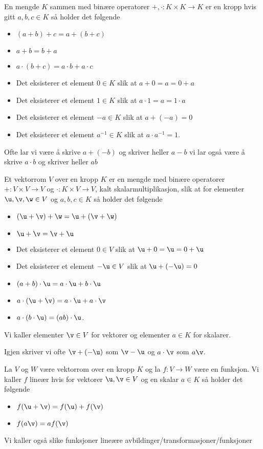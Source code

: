 \begin{definition}\label{Def:Kropp}
   En mengde $K$ sammen med binære operatorer $+,\cdot: K\times K\to K$ er en kropp hvis gitt $a,b,c\in K$ så holder det følgende
   \begin{itemize}
    \item $(a+b)+c = a+(b+c)$
    \item $a+b = b+a$
    \item $a\cdot(b+c)=a\cdot b + a\cdot c$
    \item Det eksisterer et element $0\in K$ slik at $a+0=a=0+a$
    \item Det eksisterer et element $1\in K$ slik at $a\cdot 1 = a = 1\cdot a$
    \item Det eksisterer et element $-a\in K$ slik at $a+ (-a) = 0$
    \item Det eksisterer et element $a^{-1}\in K$ slik at $a\cdot a^{-1}=1$.
   \end{itemize} 
\end{definition}
Ofte lar vi være å skrive $a+(-b)$ og skriver heller $a-b$ vi lar også være å skrive $a\cdot b$ og skriver heller $ab$

\begin{definition}\label{Def:Vektrom}
    Et vektorrom $V$ over en kropp $K$ er en mengde med binære operatorer $+:V\times V\to V$ og $\cdot: K\times V\to V$, kalt skalarmultiplikasjon, slik at for elementer $\u,\v,\w\in V$ og $a,b,c\in K$ så holder det følgende
    \begin{itemize}
    \item $(\u+\v)+\w = \u+(\v+\w)$
    \item $\u+\v=\v+\u$
    \item Det eksisterer et element $0\in V$ slik at $\u+0=\u=0+\u$
    \item Det eksisterer et element $-\u\in V$ slik at $\u+(-\u)=0$
    \item $(a+b)\cdot \u = a\cdot \u + b\cdot \u$
    \item $a\cdot(\u+\v) = a\cdot \u + a\cdot \v$
    \item $a\cdot (b\cdot \u) = (ab)\cdot \u$.
    \end{itemize}
    Vi kaller elementer $\v\in V$ for vektorer og elementer $a\in K$ for skalarer.
\end{definition}
Igjen skriver vi ofte $\v+(-\u)$ som $\v-\u$ og $a\cdot \v$ som $a\v$.

\begin{definition}\label{Def:LinAvb}
    La $V$ og $W$ være vektorrom over en kropp $K$ og la $f: V\to W$ være en funksjon. Vi kaller $f$ lineær hvis for vektorer $\u,\v\in V$ og en skalar $a\in K$ så holder det følgende
    \begin{itemize}
    \item $f(\u+\v) = f(\u)+f(\v)$
    \item $f(a\v) = af(\v)$
    \end{itemize}
    Vi kaller også slike funksjoner lineære avbildinger/transformasjoner/funksjoner
\end{definition}

